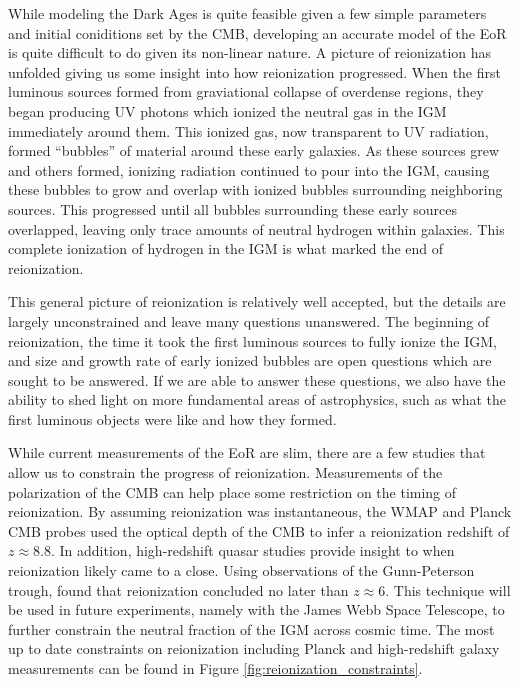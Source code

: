 While modeling the Dark Ages is quite feasible given a few simple parameters and initial
coniditions set by the CMB, developing an accurate model of the EoR is quite difficult
to do given its non-linear nature. A picture of reionization has unfolded
giving us some insight into how reionization progressed. When the first luminous sources formed from graviational collapse of
overdense regions, they began producing UV photons which ionized the neutral gas in the
IGM immediately around them. This ionized gas, now transparent to UV radiation,
formed ``bubbles'' of material around these early galaxies. As these sources grew and others formed, ionizing radiation
continued to pour into the IGM, causing these bubbles to grow and overlap with ionized
bubbles surrounding neighboring sources. This progressed until all bubbles surrounding these
early sources overlapped, leaving only trace amounts of neutral hydrogen within galaxies.
This complete ionization of hydrogen in the IGM is what marked the end of reionization.

This general picture of reionization is relatively well accepted, but the details
are largely unconstrained and leave many questions unanswered.
The beginning of reionization, the time it took the first luminous sources to fully ionize
the IGM, and size and growth rate of early ionized bubbles are open questions which are
sought to be answered. If we are able to answer these questions, we also have the
ability to shed light on more fundamental areas of astrophysics, such as what the
first luminous objects were like and how they formed.

While current measurements of the EoR are slim, there are a few studies that allow us
to constrain the progress of reionization. Measurements of the polarization
of the CMB can help place some restriction on the timing of reionization. By assuming
reionization was instantaneous, the WMAP and Planck CMB probes used the optical depth of the
CMB to infer a reionization redshift of $z \approx 8.8$. In addition, high-redshift quasar studies provide insight to
when reionization likely came to a close. Using observations of the Gunn-Peterson trough, \cite{2006AJ....132..117F}
found that reionization concluded no later than $z \approx 6$. This technique will
be used in future experiments, namely with the James Webb Space Telescope, to further
constrain the neutral fraction of the IGM across cosmic time. The most up to date constraints on reionization including
Planck and high-redshift galaxy measurements can be found in Figure \ref{fig:reionization_constraints}.

